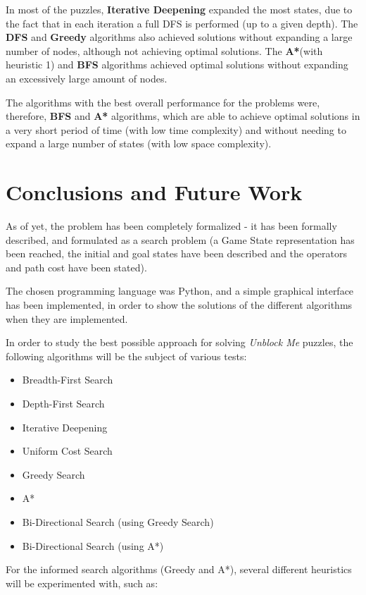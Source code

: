 \documentclass[conference]{IEEEtran}
\begin{document}
In most of the puzzles, \textbf{Iterative Deepening} expanded the most states, due to the fact that in each iteration a full DFS is performed (up to a given depth). The \textbf{DFS} and \textbf{Greedy} algorithms also achieved solutions without expanding a large number of nodes, although not achieving optimal solutions. The \textbf{A*}(with heuristic 1) and \textbf{BFS} algorithms achieved optimal solutions without expanding an excessively large amount of nodes.

The algorithms with the best overall performance for the problems were, therefore, \textbf{BFS} and \textbf{A*} algorithms, which are able to achieve optimal solutions in a very short period of time (with low time complexity) and without needing to expand a large number of states (with low space complexity).

\section{Conclusions and Future Work}
As of yet, the problem has been completely formalized - it has been formally described, and formulated as a search problem (a Game State representation has been reached, the initial and goal states have been described and the operators and path cost have been stated).

The chosen programming language was Python, and a simple graphical interface has been implemented, in order to show the solutions of the different algorithms when they are implemented.

In order to study the best possible approach for solving \textit{Unblock Me} puzzles, the following algorithms will be the subject of various tests:
\begin{itemize}
    \item Breadth-First Search
    \item Depth-First Search
    \item Iterative Deepening
    \item Uniform Cost Search
    \item Greedy Search
    \item A*
    \item Bi-Directional Search (using Greedy Search)
    \item Bi-Directional Search (using A*)
\end{itemize}

For the informed search algorithms (Greedy and A*), several different heuristics will be experimented with, such as:
\end{document}
